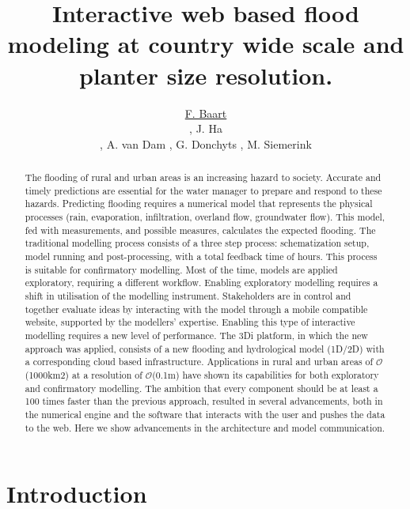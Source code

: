 \documentclass[a4paper]{article}
\title{Interactive web based flood modeling at country wide scale and planter size resolution.}
\author{\underline{F. Baart}
\address[A1]{\it{Deltares,
Rotterdamseweg
Delft, The Netherlands (fedor.baart@deltares.nl, arthur.vandam@deltares.nl, gennadii.donchyts@deltares.nl)}},
J. Ha
\address[B1]{\it{Nelen \& Schuurmans,
Zakkendragerssteeg,
Utrecht, The Netherlands (jack.ha@nelen-schuurmans.nl, martijn.siemerink@nelen-schuurmans.nl)}},
A. van Dam \addressmark[A1],
G. Donchyts \addressmark[A1],
M. Siemerink \addressmark[B1]
}
\DeclareRobustCommand{\orderof}{\ensuremath{\mathcal{O}}}
\DeclareRobustCommand{\threedi}{3Di }
\begin{document}
\begin{abstract}
The flooding of rural and urban areas is an increasing hazard to society. Accurate and timely predictions are essential for the water manager to prepare and respond to these hazards.
Predicting flooding requires a numerical model that represents the physical processes (rain, evaporation, infiltration, overland flow, groundwater flow). This model, fed with measurements, and possible measures, calculates the expected flooding.
The traditional modelling process consists of a three step process: schematization setup, model running and post-processing, with a total feedback time of hours.  This process is suitable for confirmatory modelling. Most of the time, models are applied exploratory, requiring a different workflow.
Enabling exploratory modelling requires a shift in utilisation of the modelling instrument. Stakeholders are in control and together evaluate ideas by interacting with the model through a mobile compatible website, supported by the modellers’ expertise. Enabling this type of interactive modelling requires a new level of performance.
The \threedi platform, in which the new approach was applied, consists of a new flooding and hydrological model (1D/2D) with a corresponding cloud based infrastructure. Applications in rural and urban areas of \orderof(1000km2) at a resolution of \orderof(0.1m) have shown its capabilities for both exploratory and confirmatory modelling.
The ambition that every component should be at least a 100 times faster than the previous approach, resulted in several advancements, both in the numerical engine and the software that interacts with the user and pushes the data to the web. Here we show advancements in the architecture and model communication.

\end{abstract}
\begin{keyword}
\end{keyword}

\maketitle


\section{Introduction}
\end{document}
